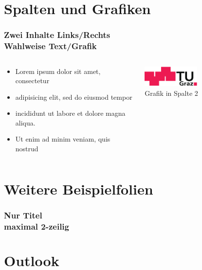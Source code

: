 \documentclass{beamer}
\begin{document}
\section{Spalten und Grafiken}
\begin{frame}
	\frametitle{Zwei Inhalte Links/Rechts\\Wahlweise Text/Grafik}
	\begin{columns}[onlytextwidth]
		\begin{column}{0.5\textwidth}
			\begin{itemize}
				\item Lorem ipsum dolor sit amet, consectetur 
				\item adipisicing elit, sed do eiusmod tempor 
				\item incididunt ut labore et dolore magna aliqua. 
				\item Ut enim ad minim veniam, quis nostrud 
			\end{itemize}
		\end{column}
		\begin{column}{0.5\textwidth}
			\begin{center}
			\includegraphics[width=0.5\textwidth]{logo.pdf}\\
			Grafik in Spalte 2
			\end{center}
		\end{column}
	\end{columns}
\end{frame}

\section{Weitere Beispielfolien}

\begin{frame}
	\frametitle{Nur Titel \\maximal 2-zeilig}
\end{frame}



\section{Outlook}
\end{document}

